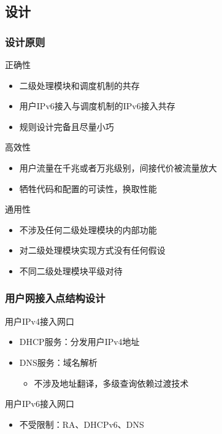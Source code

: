 \documentclass{beamer}
\begin{document}
\subsection{设计}
\begin{frame}
  \frametitle{设计原则}

  \begin{block}{正确性}
    \begin{itemize}
    \item 二级处理模块和调度机制的共存
    \item 用户IPv6接入与调度机制的IPv6接入共存
    \item 规则设计完备且尽量小巧
    \end{itemize}
  \end{block}

  \begin{block}{高效性}
    \begin{itemize}
    \item 用户流量在千兆或者万兆级别，间接代价被流量放大
    \item 牺牲代码和配置的可读性，换取性能
    \end{itemize}
  \end{block}

  \begin{block}{通用性}
    \begin{itemize}
    \item 不涉及任何二级处理模块的内部功能
    \item 对二级处理模块实现方式没有任何假设
    \item 不同二级处理模块平级对待
    \end{itemize}
  \end{block}
\end{frame}

\begin{frame}
  \frametitle{用户网接入点结构设计}
  \begin{block}{用户IPv4接入网口}
    \begin{itemize}
    \item DHCP服务：分发用户IPv4地址
    \item DNS服务：域名解析
      \begin{itemize}
      \item 不涉及地址翻译，多级查询依赖过渡技术
      \end{itemize}
    \end{itemize}
  \end{block}

  \begin{block}{用户IPv6接入网口}
    \begin{itemize}
    \item 不受限制：RA、DHCPv6、DNS
    \end{itemize}
  \end{block}
\end{frame}
\end{document}
